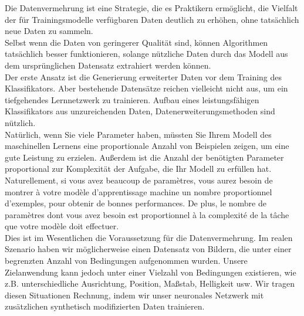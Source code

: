 \documentclass[12pt,a4paper]{scrartcl}
\numberwithin{equation}{section}
\begin{document}
 
 Die Datenvermehrung ist eine Strategie, die es Praktikern ermöglicht, die Vielfalt der für Trainingsmodelle verfügbaren Daten deutlich zu erhöhen, ohne tatsächlich neue Daten zu sammeln.\\
 
 
 Selbst wenn die Daten von geringerer Qualität sind, können Algorithmen tatsächlich besser funktionieren, solange nützliche Daten durch das Modell aus dem ursprünglichen Datensatz extrahiert werden können.\\
 Der erste Ansatz ist die Generierung erweiterter Daten vor dem Training des Klassifikators.
 Aber bestehende Datensätze reichen vielleicht nicht aus, um ein tiefgehendes Lernnetzwerk zu trainieren. Aufbau eines leistungsfähigen Klassifikators aus unzureichenden Daten, Datenerweiterungsmethoden sind nützlich.\\
 Natürlich, wenn Sie viele Parameter haben, müssten Sie Ihrem Modell des maschinellen Lernens eine proportionale Anzahl von Beispielen zeigen, um eine gute Leistung zu erzielen. Außerdem ist die Anzahl der benötigten Parameter proportional zur Komplexität der Aufgabe, die Ihr Modell zu erfüllen hat.
 \\
 Naturellement, si vous avez beaucoup de paramètres, vous aurez besoin de montrer à votre modèle d'apprentissage machine un nombre proportionnel d'exemples, pour obtenir de bonnes performances. De plus, le nombre de paramètres dont vous avez besoin est proportionnel à la complexité de la tâche que votre modèle doit effectuer.\\
 Dies ist im Wesentlichen die Voraussetzung für die Datenvermehrung. Im realen Szenario haben wir möglicherweise einen Datensatz von Bildern, die unter einer begrenzten Anzahl von Bedingungen aufgenommen wurden. Unsere Zielanwendung kann jedoch unter einer Vielzahl von Bedingungen existieren, wie z.B. unterschiedliche Ausrichtung, Position, Maßstab, Helligkeit usw. Wir tragen diesen Situationen Rechnung, indem wir unser neuronales Netzwerk mit zusätzlichen synthetisch modifizierten Daten trainieren.\\
\end{document}
